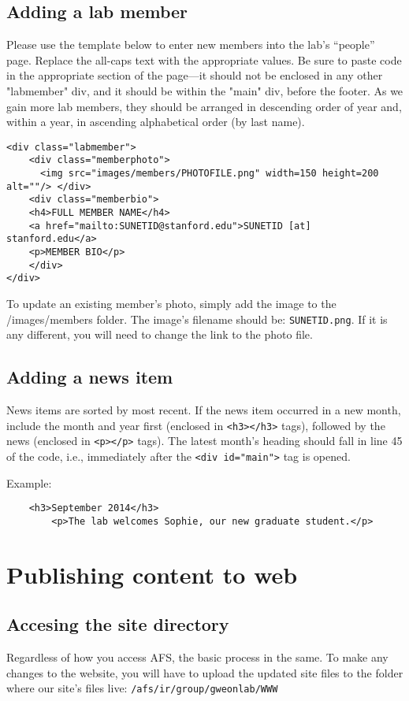\documentclass{article}
\begin{document}
\subsection{Adding a lab member}
Please use the template below to enter new members into the lab’s “people” page. Replace the all-caps text with the appropriate values. Be sure to paste code in the appropriate section of the page—it should not be enclosed in any other "labmember" div, and it should be within the "main" div, before the footer. As we gain more lab members, they should be arranged in descending order of year and, within a year, in ascending alphabetical order (by last name).

\begin{lstlisting}
<div class="labmember">
	<div class="memberphoto">
      <img src="images/members/PHOTOFILE.png" width=150 height=200 alt=""/> </div>
    <div class="memberbio">
    <h4>FULL MEMBER NAME</h4>
    <a href="mailto:SUNETID@stanford.edu">SUNETID [at] stanford.edu</a>
    <p>MEMBER BIO</p>  
    </div>
</div>
\end{lstlisting}

To update an existing member's photo, simply add the image to the /images/members folder. The image's filename should be: \texttt{SUNETID.png}. If it is any different, you will need to change the link to the photo file.

\subsection{Adding a news item}
News items are sorted by most recent. If the news item occurred in a new month, include the month and year first (enclosed in \lstinline{<h3></h3>} tags), followed by the news (enclosed in \lstinline{<p></p>} tags). The latest month's heading should fall in line 45 of the code, i.e., immediately after the \lstinline{<div id="main">} tag is opened.

Example:
\begin{lstlisting}
	<h3>September 2014</h3>
        <p>The lab welcomes Sophie, our new graduate student.</p>
\end{lstlisting}


\section{Publishing content to web}

\subsection{Accesing the site directory}
Regardless of how you access AFS, the basic process in the same. To make any changes to the website, you will have to upload the updated site files to the folder where our site's files live: \texttt{/afs/ir/group/gweonlab/WWW}\\
\end{document}
